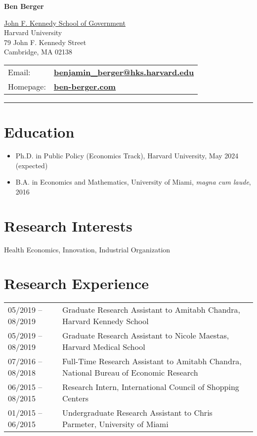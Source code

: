 \documentclass[letterpaper]{article}
\def\name{Ben Berger}
\begin{document}

\centerline{\huge \bf \name}

\vspace{2em}

\begin{minipage}{0.45\linewidth}
  \href{http://www.hks.harvard.edu/}{John F. Kennedy School of Government} \\
  Harvard University \\
  79 John F. Kennedy Street \\
  Cambridge, MA 02138
\end{minipage}
%
\begin{minipage}{0.45\linewidth}
  \begin{tabular}{ll}
    Email: & \href{mailto:benjamin\_berger@hks.harvard.edu}{\bf benjamin\_berger@hks.harvard.edu} \\
    Homepage: & \href{http://ben-berger.com/}{\bf ben-berger.com} 
  \end{tabular}
\end{minipage}

\vspace{.25em}
\hrule
\vspace{.5em}

\section*{Education}

\begin{itemize}
  \item Ph.D. in Public Policy (Economics Track), Harvard University, May 2024 (expected)
  \item B.A. in Economics and Mathematics, University of Miami, \textit{magna cum laude}, 2016
\end{itemize}

\section*{Research Interests}
Health Economics, Innovation, Industrial Organization 

\section*{Research Experience}
\begin{tabularx}{\linewidth}{@{} l X }
	05/2019 -- 08/2019 & Graduate Research Assistant to Amitabh Chandra, Harvard Kennedy School \\
	05/2019 -- 08/2019 & Graduate Research Assistant to Nicole Maestas, Harvard Medical School \\
	07/2016 -- 08/2018 & Full-Time Research Assistant to Amitabh Chandra, National Bureau of Economic Research \\
	06/2015 -- 08/2015 & Research Intern, International Council of Shopping Centers \\
	01/2015 -- 06/2015 & Undergraduate Research Assistant to Chris Parmeter, University of Miami
\end{tabularx} \\
\end{document}
